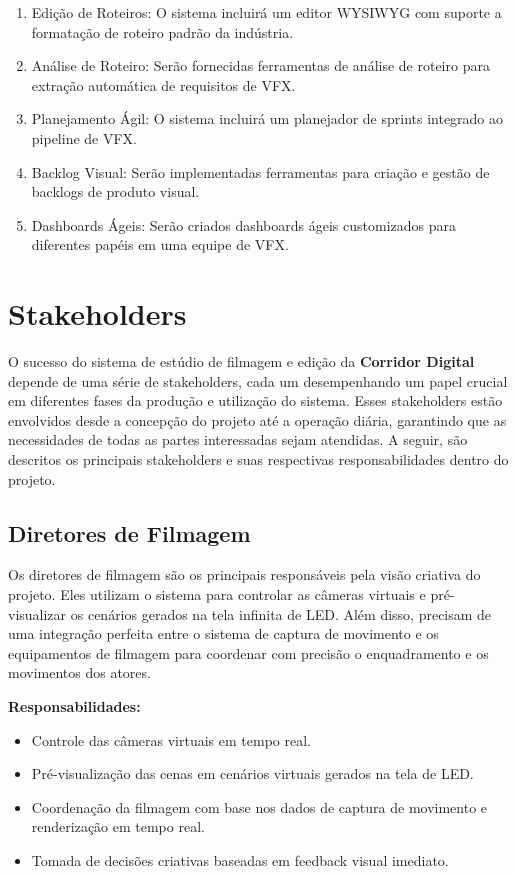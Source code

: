 \begin{enumerate}
    \item Edição de Roteiros: O sistema incluirá um editor WYSIWYG com suporte a formatação de roteiro padrão da indústria.
    \item Análise de Roteiro: Serão fornecidas ferramentas de análise de roteiro para extração automática de requisitos de VFX.
    \item Planejamento Ágil: O sistema incluirá um planejador de sprints integrado ao pipeline de VFX.
    \item Backlog Visual: Serão implementadas ferramentas para criação e gestão de backlogs de produto visual.
    \item Dashboards Ágeis: Serão criados dashboards ágeis customizados para diferentes papéis em uma equipe de VFX.
\end{enumerate}

\section{Stakeholders}

O sucesso do sistema de estúdio de filmagem e edição da \textbf{Corridor Digital} depende de uma série de stakeholders, cada um desempenhando um papel crucial em diferentes fases da produção e utilização do sistema. Esses stakeholders estão envolvidos desde a concepção do projeto até a operação diária, garantindo que as necessidades de todas as partes interessadas sejam atendidas. A seguir, são descritos os principais stakeholders e suas respectivas responsabilidades dentro do projeto.

\subsection{Diretores de Filmagem}
Os diretores de filmagem são os principais responsáveis pela visão criativa do projeto. Eles utilizam o sistema para controlar as câmeras virtuais e pré-visualizar os cenários gerados na tela infinita de LED. Além disso, precisam de uma integração perfeita entre o sistema de captura de movimento e os equipamentos de filmagem para coordenar com precisão o enquadramento e os movimentos dos atores.

\textbf{Responsabilidades:}
\begin{itemize}
  \item Controle das câmeras virtuais em tempo real.
  \item Pré-visualização das cenas em cenários virtuais gerados na tela de LED.
  \item Coordenação da filmagem com base nos dados de captura de movimento e renderização em tempo real.
  \item Tomada de decisões criativas baseadas em feedback visual imediato.
\end{itemize}

